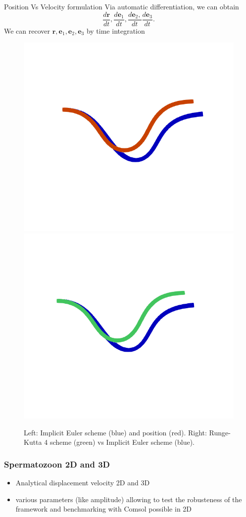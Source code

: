 \documentclass{beamer}
\begin{document}
\begin{frame}{Position Vs Velocity formulation}
	Via automatic differentiation, we can obtain \[\frac{d\textbf{r}}{dt}, \frac{d\textbf{e}_1}{dt},\frac{d\textbf{e}_2,}{dt}\frac{d \textbf{e}_3}{dt}.\] 
	We can recover $\textbf{r},\textbf{e}_1,\textbf{e}_2,\textbf{e}_3$ by time integration
\begin{figure}
	\caption[caption]{ Left: Implicit Euler scheme (blue) and position (red).
		Right: Runge-Kutta 4 scheme (green) vs Implicit Euler scheme (blue).}
	\includegraphics[width=0.45\linewidth]{gait-5.png}
	\includegraphics[width=0.45\linewidth]{gait-4.png}
\end{figure}
\end{frame}
\begin{frame}
	\frametitle{Spermatozoon 2D and 3D}

	\begin{itemize}
		\item Analytical displacement velocity 2D and 3D
		\item various parameters (like amplitude) allowing to test the robusteness of the framework and benchmarking with Comsol possible in 2D
	\end{itemize}

\end{frame}
\end{document}
